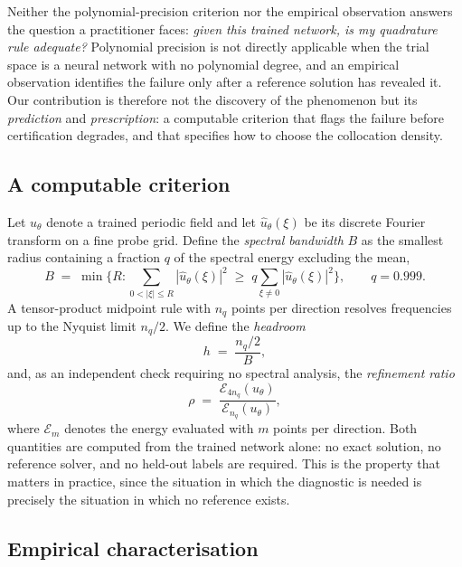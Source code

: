 Neither the polynomial-precision criterion nor the empirical observation
answers the question a practitioner faces: \emph{given this trained
network, is my quadrature rule adequate?} Polynomial precision is not
directly applicable when the trial space is a neural network with no
polynomial degree, and an empirical observation identifies the failure only
after a reference solution has revealed it. Our contribution is therefore
not the discovery of the phenomenon but its \emph{prediction} and
\emph{prescription}: a computable criterion that flags the failure before
certification degrades, and that specifies how to choose the collocation
density.

\subsection{A computable criterion}
\label{sec:quad:criterion}

Let $u_\theta$ denote a trained periodic field and let $\hat u_\theta(\xi)$
be its discrete Fourier transform on a fine probe grid. Define the
\emph{spectral bandwidth} $B$ as the smallest radius containing a fraction
$q$ of the spectral energy excluding the mean,
%
\begin{equation}
  B \;=\; \min\Big\{ R : \textstyle\sum_{0<|\xi|\le R} |\hat u_\theta(\xi)|^2
  \;\ge\; q \sum_{\xi \neq 0} |\hat u_\theta(\xi)|^2 \Big\},
  \qquad q = 0.999 .
  \label{eq:bandwidth}
\end{equation}
%
A tensor-product midpoint rule with $n_q$ points per direction resolves
frequencies up to the Nyquist limit $n_q/2$. We define the \emph{headroom}
%
\begin{equation}
  h \;=\; \frac{n_q/2}{B},
  \label{eq:headroom}
\end{equation}
%
and, as an independent check requiring no spectral analysis, the
\emph{refinement ratio}
%
\begin{equation}
  \rho \;=\; \frac{\mathcal{E}_{4 n_q}(u_\theta)}{\mathcal{E}_{n_q}(u_\theta)},
  \label{eq:ratio}
\end{equation}
%
where $\mathcal{E}_{m}$ denotes the energy evaluated with $m$ points per
direction. Both quantities are computed from the trained network alone: no
exact solution, no reference solver, and no held-out labels are required.
This is the property that matters in practice, since the situation in which
the diagnostic is needed is precisely the situation in which no reference
exists.

\subsection{Empirical characterisation}
\label{sec:quad:empirical}

